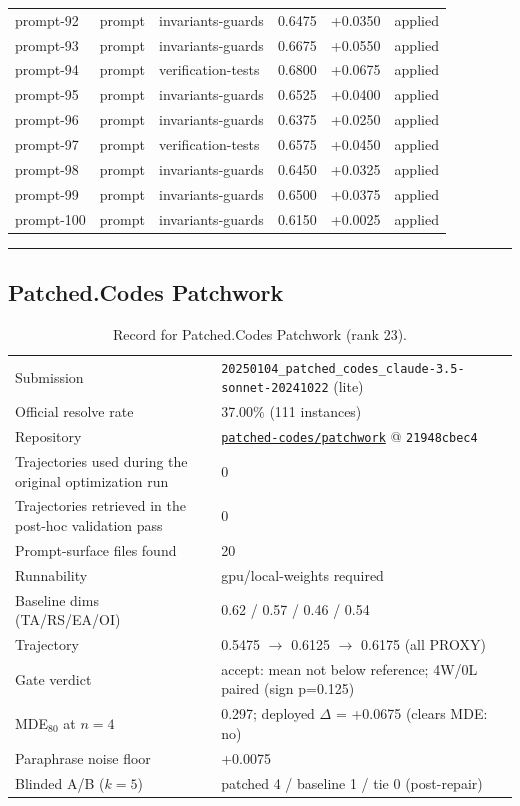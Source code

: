 \begin{center}
\begin{longtable}{llp{5.2cm}rrl}
prompt-92 & prompt & invariants-guards & 0.6475 & +0.0350 & applied \\
prompt-93 & prompt & invariants-guards & 0.6675 & +0.0550 & applied \\
prompt-94 & prompt & verification-tests & 0.6800 & +0.0675 & applied \\
prompt-95 & prompt & invariants-guards & 0.6525 & +0.0400 & applied \\
prompt-96 & prompt & invariants-guards & 0.6375 & +0.0250 & applied \\
prompt-97 & prompt & verification-tests & 0.6575 & +0.0450 & applied \\
prompt-98 & prompt & invariants-guards & 0.6450 & +0.0325 & applied \\
prompt-99 & prompt & invariants-guards & 0.6500 & +0.0375 & applied \\
prompt-100 & prompt & invariants-guards & 0.6150 & +0.0025 & applied \\
\bottomrule\end{longtable}\end{center}
\par\bigskip\hrule\bigskip
\subsection{Patched.Codes Patchwork}
\label{app:agent23}
\begin{table}[H]\centering\scriptsize
\caption{Record for Patched.Codes Patchwork (rank 23).}
\begin{tabular}{lp{8.2cm}}\toprule
Submission & \texttt{20250104\_\allowbreak{}patched\_\allowbreak{}codes\_\allowbreak{}claude-3.5-sonnet-20241022} (lite) \\
Official resolve rate & 37.00\% (111 instances) \\
Repository & \href{https://github.com/patched-codes/patchwork}{\texttt{patched-codes/patchwork}} @ \texttt{21948cbec4} \\
Trajectories used during the original optimization run & 0 \\
Trajectories retrieved in the post-hoc validation pass & 0 \\
Prompt-surface files found & 20 \\
Runnability & gpu/local-weights required \\
Baseline dims (TA/RS/EA/OI) & 0.62 / 0.57 / 0.46 / 0.54 \\
Trajectory & 0.5475 $\to$ 0.6125 $\to$ 0.6175 (all PROXY) \\
Gate verdict & accept: mean not below reference; 4W/0L paired (sign p=0.125) \\
MDE$_{80}$ at $n{=}4$ & 0.297; deployed $\Delta$ = +0.0675 (clears MDE: no) \\
Paraphrase noise floor & +0.0075 \\
Blinded A/B ($k{=}5$) & patched 4 / baseline 1 / tie 0 (post-repair) \\
\bottomrule\end{tabular}\end{table}
